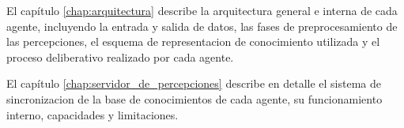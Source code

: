 El capítulo \ref{chap:arquitectura} describe la arquitectura general e
interna de cada agente, incluyendo la entrada y salida de datos, las
fases de preprocesamiento de las percepciones, el esquema de
representacion de conocimiento utilizada y el proceso deliberativo
realizado por cada agente.

El capítulo \ref{chap:servidor_de_percepciones} describe en detalle el
sistema de sincronizacion de la base de conocimientos de cada agente,
su funcionamiento interno, capacidades y limitaciones.
